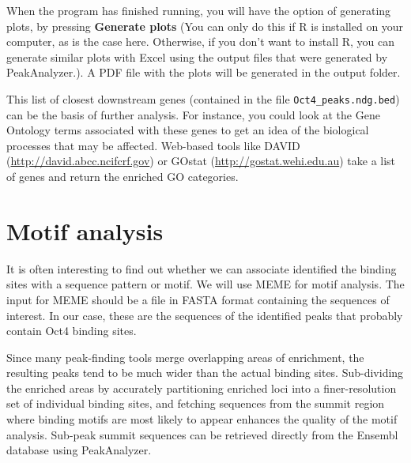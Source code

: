 \begin{information}
When the program has finished running, you will have the option of generating
plots, by pressing \textbf{Generate plots} (You can only do this if R is
installed on your computer, as is the case here. Otherwise, if you don't want to
install R, you can generate similar plots with Excel using the output files that
were generated by PeakAnalyzer.). A PDF file with the plots will be generated in
the output folder.
\end{information}

\begin{note}
This list of closest downstream genes (contained in the file
\texttt{Oct4\_peaks.ndg.bed}) can be the basis of further analysis. For instance,
you could look at the Gene Ontology terms associated with these genes to get an
idea of the biological processes that may be affected. Web-based tools like
DAVID (\url{http://david.abcc.ncifcrf.gov}) or GOstat
(\url{http://gostat.wehi.edu.au}) take a list of genes and return the enriched
GO categories.
\end{note}


\section{Motif analysis}

\begin{information}
It is often interesting to find out whether we can associate identified the
binding sites with a sequence pattern or motif. We will use MEME for motif
analysis. The input for MEME should be a file in FASTA format containing the
sequences of interest. In our case, these are the sequences of the identified
peaks that probably contain Oct4 binding sites.

Since many peak-finding tools merge overlapping areas of enrichment, the
resulting peaks tend to be much wider than the actual binding sites.
Sub-dividing the enriched areas by accurately partitioning enriched loci into a
finer-resolution set of individual binding sites, and fetching sequences from
the summit region where binding motifs are most likely to appear enhances the
quality of the motif analysis. Sub-peak summit sequences can be retrieved
directly from the Ensembl database using PeakAnalyzer.
\end{information}

